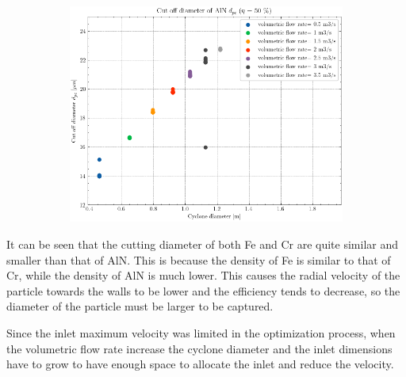 \begin{figure}[H]
\begin{subfigure}{.49\textwidth}
		\includegraphics[width=1.0\linewidth]{images/d_pc_AlN.png}
		\caption{}
		\label{AlN_d_cut_off}
	\end{subfigure}
	\captionsetup{font=bf, size=small}
	\caption{ }
	\label{}
\end{figure}

It can be seen that the cutting diameter of both Fe and Cr are quite similar and smaller than that of AlN. This is because the density of Fe is similar to that of Cr, while the density of AlN is much lower. This causes the radial velocity of the particle towards the walls to be lower and the efficiency tends to decrease, so the diameter of the particle must be larger to be captured.

Since the inlet maximum velocity was limited in the optimization process, when the volumetric flow rate increase the cyclone diameter and the inlet dimensions have to grow to have enough space to allocate the inlet and reduce the velocity.    

